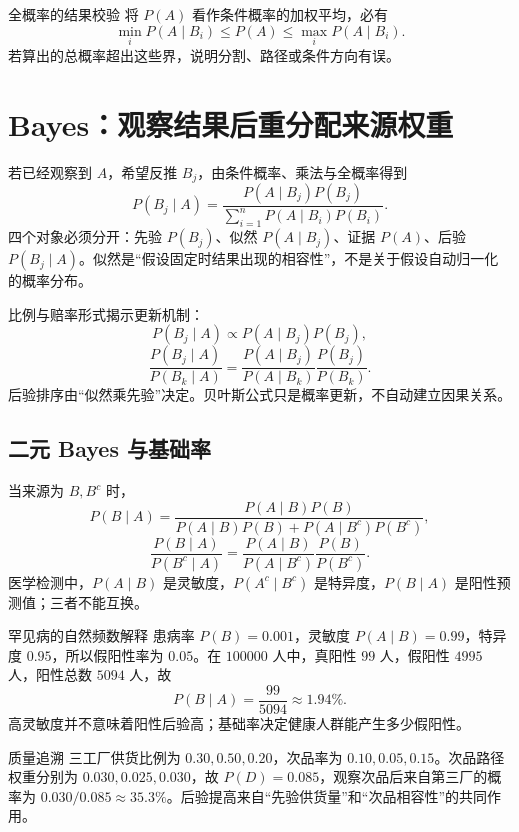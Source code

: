 \documentclass[11pt,a4paper]{ctexart}
\newenvironment{handbookdiagram}{\par\vspace{0.4em}\noindent\begin{center}}{\end{center}\vspace{0.4em}}
\begin{document}
\begin{methodbox}{全概率的结果校验}
将 $P(A)$ 看作条件概率的加权平均，必有
\[
\min_iP(A\mid B_i)\le P(A)\le\max_iP(A\mid B_i).
\]
若算出的总概率超出这些界，说明分割、路径或条件方向有误。
\end{methodbox}

\section{Bayes：观察结果后重分配来源权重}

若已经观察到 $A$，希望反推 $B_j$，由条件概率、乘法与全概率得到
\[
\boxed{P(B_j\mid A)=\frac{P(A\mid B_j)P(B_j)}{\displaystyle\sum_{i=1}^{n}P(A\mid B_i)P(B_i)}}.
\]
四个对象必须分开：先验 $P(B_j)$、似然 $P(A\mid B_j)$、证据 $P(A)$、后验 $P(B_j\mid A)$。似然是“假设固定时结果出现的相容性”，不是关于假设自动归一化的概率分布。

比例与赔率形式揭示更新机制：
\[
P(B_j\mid A)\propto P(A\mid B_j)P(B_j),
\]
\[
\boxed{\frac{P(B_j\mid A)}{P(B_k\mid A)}=\frac{P(A\mid B_j)}{P(A\mid B_k)}\frac{P(B_j)}{P(B_k)}}.
\]
后验排序由“似然乘先验”决定。贝叶斯公式只是概率更新，不自动建立因果关系。

\begin{handbookdiagram}
\resizebox{0.92\linewidth}{!}{%
%
}
\end{handbookdiagram}

\subsection{二元 Bayes 与基础率}

当来源为 $B,B^c$ 时，
\[
P(B\mid A)=\frac{P(A\mid B)P(B)}{P(A\mid B)P(B)+P(A\mid B^c)P(B^c)},
\]
\[
\frac{P(B\mid A)}{P(B^c\mid A)}=\frac{P(A\mid B)}{P(A\mid B^c)}\frac{P(B)}{P(B^c)}.
\]
医学检测中，$P(A\mid B)$ 是灵敏度，$P(A^c\mid B^c)$ 是特异度，$P(B\mid A)$ 是阳性预测值；三者不能互换。

\begin{examplebox}{罕见病的自然频数解释}
患病率 $P(B)=0.001$，灵敏度 $P(A\mid B)=0.99$，特异度 $0.95$，所以假阳性率为 $0.05$。在 $100000$ 人中，真阳性 $99$ 人，假阳性 $4995$ 人，阳性总数 $5094$ 人，故
\[
P(B\mid A)=\frac{99}{5094}\approx1.94\%.
\]
高灵敏度并不意味着阳性后验高；基础率决定健康人群能产生多少假阳性。
\end{examplebox}

\begin{examplebox}{质量追溯}
三工厂供货比例为 $0.30,0.50,0.20$，次品率为 $0.10,0.05,0.15$。次品路径权重分别为 $0.030,0.025,0.030$，故 $P(D)=0.085$，观察次品后来自第三厂的概率为 $0.030/0.085\approx35.3\%$。后验提高来自“先验供货量”和“次品相容性”的共同作用。
\end{examplebox}
\end{document}
